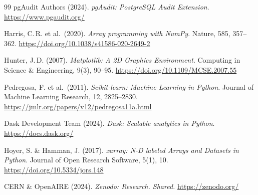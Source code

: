 \documentclass[12pt,a4paper]{report}
\theoremstyle{definition}
\theoremstyle{remark}
\begin{document}
\begin{thebibliography}{99}
  pgAudit Authors (2024).
  \textit{pgAudit: PostgreSQL Audit Extension}.
  \url{https://www.pgaudit.org/}

  Harris, C.\,R. et al.\ (2020).
  \textit{Array programming with NumPy}.
  Nature, 585, 357--362.
  \url{https://doi.org/10.1038/s41586-020-2649-2}

  Hunter, J.\,D. (2007).
  \textit{Matplotlib: A 2D Graphics Environment}.
  Computing in Science \& Engineering, 9(3), 90--95.
  \url{https://doi.org/10.1109/MCSE.2007.55}

  Pedregosa, F. et al.\ (2011).
  \textit{Scikit-learn: Machine Learning in Python}.
  Journal of Machine Learning Research, 12, 2825--2830.
  \url{https://jmlr.org/papers/v12/pedregosa11a.html}

  Dask Development Team (2024).
  \textit{Dask: Scalable analytics in Python}.
  \url{https://docs.dask.org/}

  Hoyer, S. \& Hamman, J. (2017).
  \textit{xarray: N-D labeled Arrays and Datasets in Python}.
  Journal of Open Research Software, 5(1), 10.
  \url{https://doi.org/10.5334/jors.148}

  CERN \& OpenAIRE (2024).
  \textit{Zenodo: Research. Shared.}
  \url{https://zenodo.org/}

\end{thebibliography}
\end{document}
